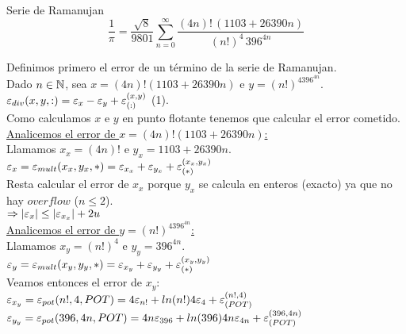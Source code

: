 \begin{subsection}{Serie de Ramanujan}
	\begin{equation*}
		\frac{1}{\pi} = \frac{\sqrt{8}}{9801} \sum_{n=0}^{\infty} \frac{(4n)! \, (1103 + 26390 n)}{(n!)^4 \, 396^{4n}}
    \end{equation*}
	
	\pa
	
	Definimos primero el error de un término de la serie de Ramanujan.\\

	Dado $n \in \mathbb{N}$, sea $x=(4n)!(1103+26390n)$ e $y=(n!)^4396^{4n}$.\\
	
	$\varepsilon _{div}({x,y,:}) = \varepsilon _{x} - \varepsilon _{y} + \varepsilon _{({:})}^{({x,y})}$ (1).\\
	
	Como calculamos $x$ e $y$ en punto flotante tenemos que calcular el error cometido.\\
	
	\underline{Analicemos el error de $x=(4n)!(1103+26390n)$:}\\
	
	Llamamos $x_x=(4n)!$ e $y_x=1103+26390n$.\\

	$\varepsilon _{x} = \varepsilon _{mult}({x_x,y_x,*}) = \varepsilon _{x_x}+\varepsilon _{y_x}+\varepsilon _{({*})}^{({x_x,y_x})}$\\
	
	Resta calcular el error de $x_x$ porque $y_x$ se calcula en enteros (exacto) ya que no hay $overflow$ ($n \leq 2$).\\
	
	$\Rightarrow \left|\varepsilon _{x}\right| \leq \left|\varepsilon _{x_x}\right| + 2u$\\
	
	\underline{Analicemos el error de $y=(n!)^4396^{4n}$:}\\
	
	Llamamos $x_y=(n!)^4$ e $y_y=396^{4n}$.\\
	
	$\varepsilon _{y} = \varepsilon _{mult}({x_y,y_y,*}) = {\varepsilon _{x_y}+\varepsilon _{y_y}+\varepsilon _{({*})}^{({x_y,y_y})}}$\\

	Veamos entonces el error de $x_y$:\\
	
	$\varepsilon _{x_y} = \varepsilon _{pot}({n!,4,POT}) = 4\varepsilon _{n!} + ln(n!) 4\varepsilon _{4} + \varepsilon _{({POT})}^{({n!,4})}$\\
	
	$\varepsilon _{y_y} = \varepsilon _{pot}({396,4n,POT}) = 4n\varepsilon _{396} + ln(396) 4n\varepsilon _{4n} + \varepsilon _{({POT})}^{({396,4n})}$\\
	

\end{subsection}
